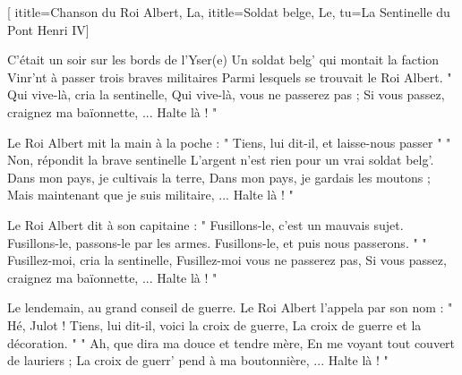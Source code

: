  [
ititle={Chanson du Roi Albert, La},
ititle={Soldat belge, Le},
tu={La Sentinelle du Pont Henri IV}]


\beginverse
C'était un soir sur les bords de l'Yser(e)
Un soldat belg' qui montait la faction
Vinr'nt à passer trois braves militaires
Parmi lesquels se trouvait le Roi Albert.
" Qui vive-là, cria la sentinelle,
Qui vive-là, vous ne passerez pas ;
Si vous passez, craignez ma baïonnette,
 ... Halte là ! "
\endverse

\beginverse
Le Roi Albert mit la main à la poche :
" Tiens, lui dit-il, et laisse-nous passer "
" Non, répondit la brave sentinelle
L'argent n'est rien pour un vrai soldat belg'.
Dans mon pays, je cultivais la terre,
Dans mon pays, je gardais les moutons ;
Mais maintenant que je suis militaire,
 ... Halte là ! "
\endverse

\beginverse
Le Roi Albert dit à son capitaine :
" Fusillons-le, c'est un mauvais sujet.
Fusillons-le, passons-le par les armes.
Fusillons-le, et puis nous passerons. "
" Fusillez-moi, cria la sentinelle,
Fusillez-moi vous ne passerez pas,
Si vous passez, craignez ma baïonnette,
 ... Halte là ! "
\endverse

\beginverse
Le lendemain, au grand conseil de guerre.
Le Roi Albert l'appela par son nom : " Hé, Julot !
Tiens, lui dit-il, voici la croix de guerre,
La croix de guerre et la décoration. "
" Ah, que dira ma douce et tendre mère,
En me voyant tout couvert de lauriers ;
La croix de guerr' pend à ma boutonnière,
 ... Halte là ! "
\endverse

\endsong